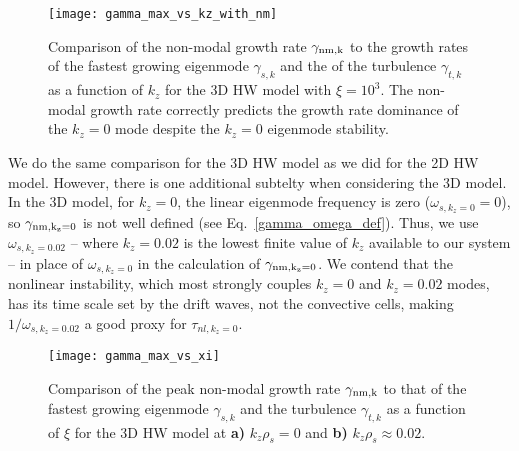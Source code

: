 \documentclass[twocolumn,showkeys,superscriptaddress]{revtex4}
\begin{document}
\begin{figure}
\centerline{\texttt{[image: gamma\_max\_vs\_kz\_with\_nm]}}
\caption{Comparison of the non-modal growth rate $\gamma_{\rm{nm},k}$ to the growth rates of the fastest growing eigenmode $\gamma_{s,k}$ 
and the of the turbulence $\gamma_{t,k}$ as a function of $k_z$ for the 3D HW model with $\xi = 10^3$. The non-modal growth rate correctly predicts the growth rate dominance of the $k_z=0$ mode
despite the $k_z=0$ eigenmode stability.}
\label{gamma_max_vs_kz_with_nm}
\end{figure}

We do the same comparison for the 3D HW model as we did for the 2D HW model. However, there is one additional subtelty when considering the 3D model. In the 3D model, for $k_z=0$, the linear
eigenmode frequency is zero ($\omega_{s,k_z=0} = 0$), so $\gamma_{\rm{nm},k_z=0}$ is not well defined (see Eq.~\ref{gamma_omega_def}). 
Thus, we use $\omega_{s,k_z=0.02}$ -- where $k_z=0.02$ is the lowest finite value of $k_z$ available to our system -- in place of
$\omega_{s,k_z=0}$ in the calculation of $\gamma_{\rm{nm},k_z=0}$. We contend that the nonlinear instability, which most strongly couples $k_z=0$ and $k_z=0.02$ modes, has its time scale set
by the drift waves, not the convective cells, making $1/\omega_{s,k_z=0.02}$ a good proxy for $\tau_{nl,k_z=0}$. 


\begin{figure}
\centerline{\texttt{[image: gamma\_max\_vs\_xi]}}
\caption{Comparison of the peak non-modal growth rate $\gamma_{\rm{nm},k}$ to that of the fastest growing eigenmode $\gamma_{s,k}$ 
and the turbulence $\gamma_{t,k}$ as a function of $\xi$ for the 3D HW model at {\bf a)} $k_z \rho_s = 0$ and {\bf b)} $k_z \rho_s \approx 0.02$. }
\label{gamma_max_vs_xi}
\end{figure}
\end{document}
